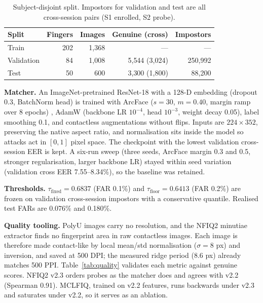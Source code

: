 \documentclass[10pt,twocolumn,letterpaper]{article}
\newcommand{\taufix}{\tau_{\mathrm{fixed}}}
\newcommand{\taufloor}{\tau_{\mathrm{floor}}}
\begin{document}
\begin{table}[t]
\centering\footnotesize\setlength{\tabcolsep}{3.5pt}
\caption{Subject-disjoint split. Impostors for validation and test are all cross-session pairs (S1 enrolled, S2 probe).}
\label{tab:split}
\begin{tabular}{lrrrr}
\toprule
Split & Fingers & Images & Genuine (cross) & Impostors \\
\midrule
Train & 202 & 1{,}368 & --- & --- \\
Validation & 84 & 1{,}008 & 5{,}544 (3{,}024) & 250{,}992 \\
Test & 50 & 600 & 3{,}300 (1{,}800) & 88{,}200 \\
\bottomrule
\end{tabular}
\end{table}

\textbf{Matcher.} An ImageNet-pretrained ResNet-18 \cite{he2016} with a 128-D embedding (dropout 0.3, BatchNorm head) is trained with ArcFace ($s=30$, $m=0.40$, margin ramp over 8 epochs) \cite{deng2019}, AdamW (backbone LR $10^{-4}$, head $10^{-3}$, weight decay 0.05), label smoothing 0.1, and contactless augmentations without flips. Inputs are $224\times352$, preserving the native aspect ratio, and normalisation sits inside the model so attacks act in $[0,1]$ pixel space. The checkpoint with the lowest validation cross-session EER is kept. A six-run sweep (three seeds, ArcFace margin 0.3 and 0.5, stronger regularisation, larger backbone LR) stayed within seed variation (validation cross EER 7.55--8.34\%), so the baseline was retained.

\textbf{Thresholds.} $\taufix = 0.6837$ (FAR 0.1\%) and $\taufloor = 0.6413$ (FAR 0.2\%) are frozen on validation cross-session impostors with a conservative quantile. Realised test FARs are 0.076\% and 0.180\%.

\textbf{Quality tooling.} PolyU images carry no resolution, and the NFIQ2 minutiae extractor finds no fingerprint area in raw contactless images. Each image is therefore made contact-like by local mean/std normalisation ($\sigma = 8$ px) and inversion, and saved at 500 DPI; the measured ridge period (8.6 px) already matches 500 PPI. Table~\ref{tab:quality} validates each metric against genuine scores. NFIQ2 v2.3 orders probes as the matcher does and agrees with v2.2 (Spearman 0.91). MCLFIQ, trained on v2.2 features, runs backwards under v2.3 and saturates under v2.2, so it serves as an ablation.
\end{document}
